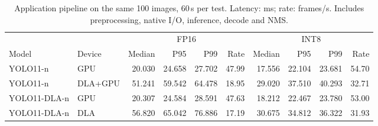 \begin{table}[t]
\caption{Application pipeline on the same 100 images, 60\,s per test. Latency: ms; rate: frames/s. Includes preprocessing, native I/O, inference, decode and NMS.}
\label{tab:e2e}\centering\footnotesize
\setlength{\tabcolsep}{4pt}
\begin{tabular*}{\textwidth}{@{\extracolsep{\fill}}llrrrrrrrr@{}}
\toprule
& & \multicolumn{4}{c}{FP16} & \multicolumn{4}{c}{INT8} \\
\cmidrule(lr){3-6}\cmidrule(l){7-10}
Model & Device & Median & P95 & P99 & Rate & Median & P95 & P99 & Rate \\
\midrule
YOLO11-n & GPU & 20.030 & 24.658 & 27.702 & 47.99 & 17.556 & 22.104 & 23.681 & 54.70 \\
YOLO11-n & DLA+GPU & 51.241 & 59.542 & 64.478 & 18.95 & 29.020 & 37.510 & 40.293 & 32.71 \\
YOLO11-DLA-n & GPU & 20.307 & 24.584 & 28.591 & 47.63 & 18.212 & 22.467 & 23.780 & 53.00 \\
YOLO11-DLA-n & DLA & 56.820 & 65.042 & 76.886 & 17.19 & 30.675 & 34.812 & 36.322 & 31.93 \\
\bottomrule
\end{tabular*}
\end{table}

